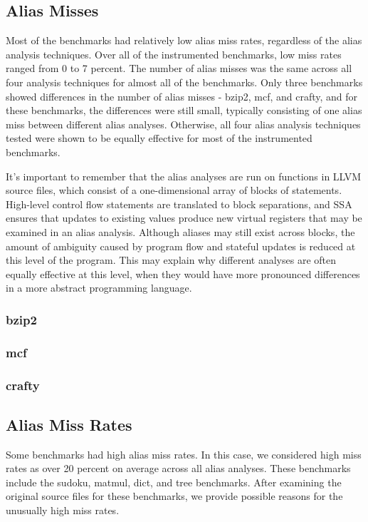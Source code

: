 \subsection{Alias Misses}
Most of the benchmarks had relatively low alias miss rates, regardless of the alias analysis techniques. Over all of the instrumented benchmarks, low miss rates ranged from 0 to 7 percent. The number of alias misses was the same across all four analysis techniques for almost all of the benchmarks. Only three benchmarks showed differences in the number of alias misses - bzip2, mcf, and crafty, and for these benchmarks, the differences were still small, typically consisting of one alias miss between different alias analyses. Otherwise, all four alias analysis techniques tested were shown to be equally effective for most of the instrumented benchmarks.

It's important to remember that the alias analyses are run on functions in LLVM source files, which consist of a one-dimensional array of blocks of statements. High-level control flow statements are translated to block separations, and SSA ensures that updates to existing values produce new virtual registers that may be examined in an alias analysis. Although aliases may still exist across blocks, the amount of ambiguity caused by program flow and stateful updates is reduced at this level of the program. This may explain why different analyses are often equally effective at this level, when they would have more pronounced differences in a more abstract programming language.

\subsubsection{bzip2}

\subsubsection{mcf}

\subsubsection{crafty}

\subsection{Alias Miss Rates}
Some benchmarks had high alias miss rates. In this case, we considered high miss rates as over 20 percent on average across all alias analyses. These benchmarks include the sudoku, matmul, dict, and tree benchmarks. After examining the original source files for these benchmarks, we provide possible reasons for the unusually high miss rates.

